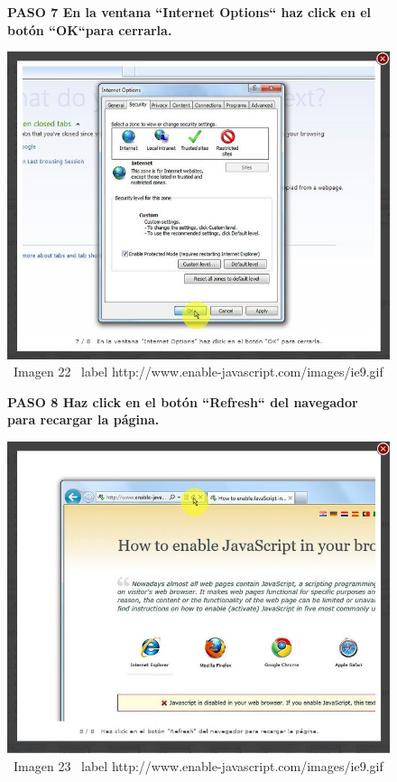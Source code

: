 \documentclass[11pt]{article} %
\begin{document}
\begin{figure}
\begin{center}

\begin{center}
\bf PASO 7
En la ventana ``Internet Options`` haz click en el botón ``OK``para cerrarla.
\end{center}
\includegraphics[height=8 cm, width=8 cm] {imagenes/explorer 07.jpg}
\newline
\newline
\ Imagen 22
\ label {http://www.enable-javascript.com/images/ie9.gif }

\begin{center}
\bf PASO 8
Haz click en el botón ``Refresh`` del navegador para recargar la página.
\end{center}

\includegraphics[height=8 cm, width=8 cm] {imagenes/explorer 08.jpg}
\newline
\newline
\ Imagen 23
\ label {http://www.enable-javascript.com/images/ie9.gif }

\end{center}
\end{figure}
\end{document}
